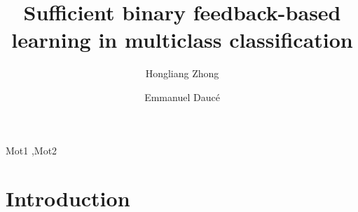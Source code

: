 \documentclass[preprint,12pt,authoryear]{elsarticle}
\begin{document}
\begin{frontmatter}



\title{Sufficient binary feedback-based learning in multiclass classification}


\author[centrale,lif]{Hongliang Zhong}
\author[centrale,ins]{Emmanuel Dauc\'e }

\address[centrale]{Ecole Centrale de Marseille}
\address[lif]{Laboratoire d'informatique Fondamentale}
\address[ins]{Institut de Neurosciences des Syst\`emes}


\begin{abstract}

\end{abstract}

\begin{keyword}
Mot1 \sep Mot2


\end{keyword}

\end{frontmatter}


\section{Introduction}
\label{sec:lentete}
\end{document}
